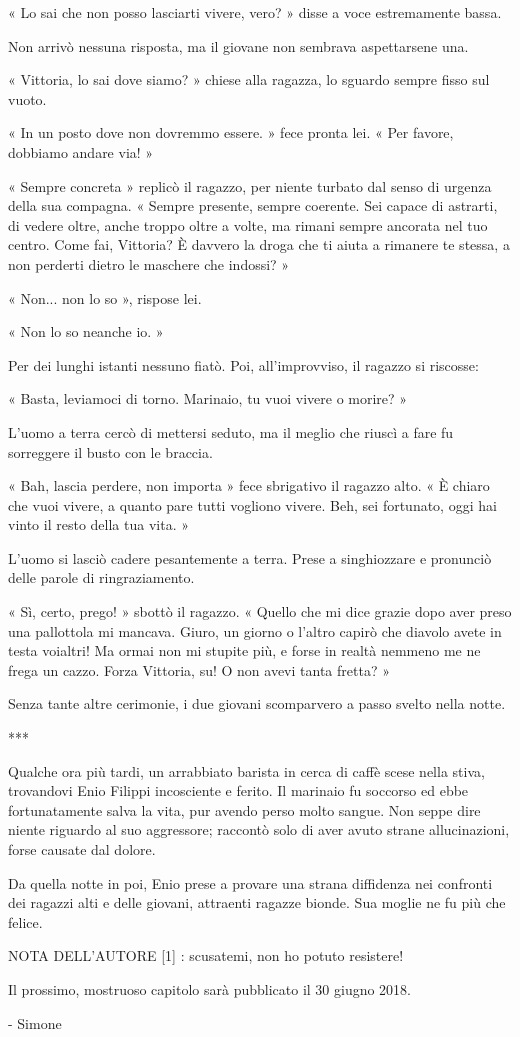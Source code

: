 « Lo sai che non posso lasciarti vivere, vero? » disse a voce estremamente bassa.

Non arrivò nessuna risposta, ma il giovane non sembrava aspettarsene una.

« Vittoria, lo sai dove siamo? » chiese alla ragazza, lo sguardo sempre fisso sul vuoto.

« In un posto dove non dovremmo essere. » fece pronta lei. « Per favore, dobbiamo andare via! »

« Sempre concreta » replicò il ragazzo, per niente turbato dal senso di urgenza della sua compagna. « Sempre presente, sempre coerente. Sei capace di astrarti, di vedere oltre, anche troppo oltre a volte, ma rimani sempre ancorata nel tuo centro. Come fai, Vittoria? È davvero la droga che ti aiuta a rimanere te stessa, a non perderti dietro le maschere che indossi? »

« Non... non lo so », rispose lei.

« Non lo so neanche io. »

Per dei lunghi istanti nessuno fiatò. Poi, all'improvviso, il ragazzo si riscosse:

« Basta, leviamoci di torno. Marinaio, tu vuoi vivere o morire? »

L'uomo a terra cercò di mettersi seduto, ma il meglio che riuscì a fare fu sorreggere il busto con le braccia.

« Bah, lascia perdere, non importa » fece sbrigativo il ragazzo alto. « È chiaro che vuoi vivere, a quanto pare tutti vogliono vivere. Beh, sei fortunato, oggi hai vinto il resto della tua vita. »

L'uomo si lasciò cadere pesantemente a terra. Prese a singhiozzare e pronunciò delle parole di ringraziamento.

« Sì, certo, prego! » sbottò il ragazzo. « Quello che mi dice grazie dopo aver preso una pallottola mi mancava. Giuro, un giorno o l'altro capirò che diavolo avete in testa voialtri! Ma ormai non mi stupite più, e forse in realtà nemmeno me ne frega un cazzo. Forza Vittoria, su! O non avevi tanta fretta? »

Senza tante altre cerimonie, i due giovani scomparvero a passo svelto nella notte.

***

Qualche ora più tardi, un arrabbiato barista in cerca di caffè scese nella stiva, trovandovi Enio Filippi incosciente e ferito. Il marinaio fu soccorso ed ebbe fortunatamente salva la vita, pur avendo perso molto sangue. Non seppe dire niente riguardo al suo aggressore; raccontò solo di aver avuto strane allucinazioni, forse causate dal dolore.

Da quella notte in poi, Enio prese a provare una strana diffidenza nei confronti dei ragazzi alti e delle giovani, attraenti ragazze bionde. Sua moglie ne fu più che felice.

NOTA DELL'AUTORE
[1] : scusatemi, non ho potuto resistere!

Il prossimo, mostruoso capitolo sarà pubblicato il 30 giugno 2018.

- Simone



